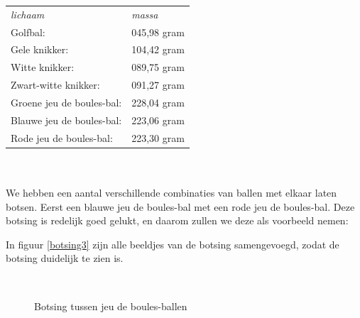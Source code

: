 \documentclass[12pt,a4paper]{article}
\begin{document}
	\begin{tabular}{|  l l |}
		\hline 
			\emph{lichaam} &\emph{massa}\\
			Golfbal: &045,98 gram\\
			Gele knikker: &104,42 gram\\
			Witte knikker: &089,75 gram\\
			Zwart-witte knikker: &091,27 gram\\
			Groene jeu de boules-bal: &228,04 gram\\
			Blauwe jeu de boules-bal: &223,06 gram\\
			Rode jeu de boules-bal: &223,30 gram\\
		\hline 
	\end{tabular}
	\\
	\\We hebben een aantal verschillende combinaties van ballen met elkaar laten botsen. Eerst een blauwe jeu de boules-bal met een rode jeu de boules-bal. Deze botsing is redelijk goed gelukt, en daarom zullen we deze als voorbeeld nemen:

	In figuur \ref{botsing3} zijn alle beeldjes van de botsing samengevoegd, zodat de botsing duidelijk te zien is.
	
	\begin{figure}[H]
		\centering
		\,
		\caption{Botsing tussen jeu de boules-ballen}
	\end{figure}
\end{document}
